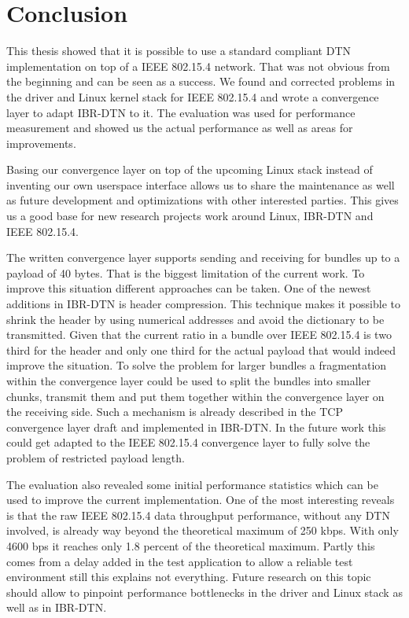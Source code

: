 \chapter{Conclusion}

This thesis showed that it is possible to use a standard compliant DTN
implementation on top of a IEEE 802.15.4 network. That was not obvious from the
beginning and can be seen as a success. We found and corrected problems in the
driver and Linux kernel stack for IEEE 802.15.4 and wrote a convergence layer to
adapt IBR-DTN to it. The evaluation was used for performance measurement and
showed us the actual performance as well as areas for improvements.

Basing our convergence layer on top of the upcoming Linux stack instead of
inventing our own userspace interface allows us to share the maintenance as well
as future development and optimizations with other interested parties. This
gives us a good base for new research projects work around Linux, IBR-DTN and
IEEE 802.15.4.

The written convergence layer supports sending and receiving for bundles up to a
payload of 40 bytes. That is the biggest limitation of the current work. To
improve this situation different approaches can be taken. One of the newest
additions in IBR-DTN is header compression. This technique makes it possible to
shrink the header by using numerical addresses and avoid the dictionary to be
transmitted. Given that the current ratio in a bundle over IEEE 802.15.4 is two
third for the header and only one third for the actual payload that would indeed
improve the situation. To solve the problem for larger bundles a fragmentation
within the convergence layer could be used to split the bundles into smaller
chunks, transmit them and put them together within the convergence layer on the
receiving side. Such a mechanism is already described in the TCP convergence
layer draft \cite{tcp-clayer-draft} and implemented in IBR-DTN. In the future
work this could get adapted to the IEEE 802.15.4 convergence layer to fully
solve the problem of restricted payload length.

The evaluation also revealed some initial performance statistics which can be
used to improve the current implementation. One of the most interesting reveals
is that the raw IEEE 802.15.4 data throughput performance, without any DTN
involved, is already way beyond the theoretical maximum of 250 kbps. With only
4600 bps it reaches only 1.8 percent of the theoretical maximum. Partly this
comes from a delay added in the test application to allow a reliable test
environment still this explains not everything. Future research on this topic
should allow to pinpoint performance bottlenecks in the driver and Linux stack
as well as in IBR-DTN.

